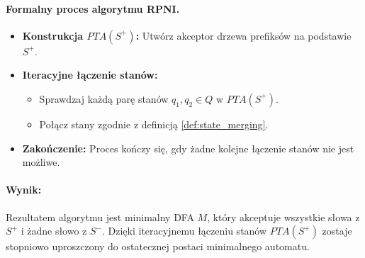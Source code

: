 \paragraph*{Formalny proces algorytmu RPNI.}
\begin{itemize}
    \item \textbf{Konstrukcja \( PTA(S^+) \):} Utwórz akceptor drzewa prefiksów na podstawie \( S^+ \).
    \item \textbf{Iteracyjne łączenie stanów:} 
    \begin{itemize}
        \item Sprawdzaj każdą parę stanów \( q_1, q_2 \in Q \) w \( PTA(S^+) \).
        \item Połącz stany zgodnie z definicją \ref{def:state_merging}.
    \end{itemize}
    \item \textbf{Zakończenie:} Proces kończy się, gdy żadne kolejne łączenie stanów nie jest możliwe.
\end{itemize}

\paragraph*{Wynik:}
Rezultatem algorytmu jest minimalny DFA \( M \), który akceptuje wszystkie słowa z \( S^+ \) i żadne słowo z \( S^- \). Dzięki iteracyjnemu łączeniu stanów \( PTA(S^+) \) zostaje stopniowo uproszczony do ostatecznej postaci minimalnego automatu.




